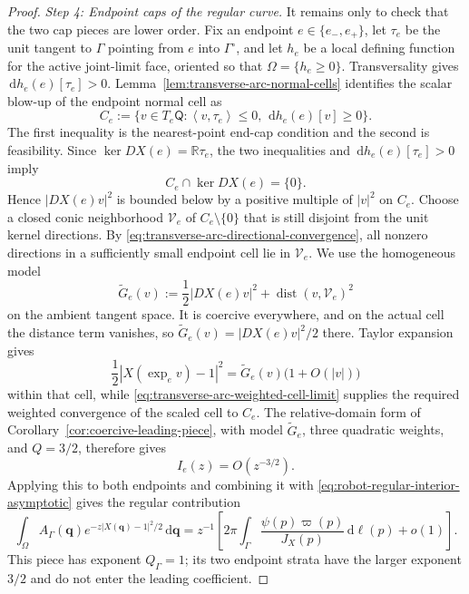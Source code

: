 \documentclass[11pt]{amsart}
\numberwithin{equation}{section}
\theoremstyle{definition}
\theoremstyle{remark}
\DeclareMathOperator{\dist}{dist}
\newcommand{\R}{\mathbb{R}}
\newcommand{\dd}{\,\mathrm{d}}
\newcommand{\inner}[2]{\left\langle #1,#2\right\rangle}
\begin{document}
\begin{proof}
\smallskip
\noindent\emph{Step 4: Endpoint caps of the regular curve.}
It remains only to check that the two cap pieces are lower order.  Fix an
endpoint $e\in\{e_-,e_+\}$, let $\tau_e$ be the unit tangent to $\Gamma$
pointing from $e$ into $\Gamma^\circ$, and let $h_e$ be a local defining
function for the active joint-limit face, oriented so that
$\Omega=\{h_e\ge0\}$.  Transversality gives
$\dd h_e(e)[\tau_e]>0$.  Lemma~\ref{lem:transverse-arc-normal-cells} identifies the scalar blow-up of
the endpoint normal cell as
\begin{equation}\label{eq:robot-endpoint-cone}
 C_e:=\{v\in T_e\mathsf Q:
       \inner{v}{\tau_e}\le0,\ \dd h_e(e)[v]\ge0\}.
\end{equation}
The first inequality is the nearest-point end-cap condition and the second is
feasibility.  Since $\ker DX(e)=\R\tau_e$, the two inequalities and
$\dd h_e(e)[\tau_e]>0$ imply
\[
 C_e\cap\ker DX(e)=\{0\}.
\]
Hence $|DX(e)v|^2$ is bounded below by a positive multiple of $|v|^2$ on
$C_e$.  Choose a closed conic neighborhood $\mathcal V_e$ of $C_e\setminus\{0\}$ that
is still disjoint from the unit kernel directions.  By
\eqref{eq:transverse-arc-directional-convergence}, all nonzero directions in a
sufficiently small endpoint cell lie in $\mathcal V_e$.  We use the homogeneous model
\[
 \widetilde G_e(v)
 :=\frac12|DX(e)v|^2+\dist(v,\mathcal V_e)^2
\]
on the ambient tangent space.  It is coercive everywhere, and on the actual
cell the distance term vanishes, so $\widetilde G_e(v)=|DX(e)v|^2/2$ there.
Taylor expansion gives
\[
 \frac12|X(\exp_e v)-1|^2
 =\widetilde G_e(v)\bigl(1+O(|v|)\bigr)
\]
within that cell, while
\eqref{eq:transverse-arc-weighted-cell-limit} supplies the required weighted
convergence of the scaled cell to $C_e$.  The relative-domain form of
Corollary~\ref{cor:coercive-leading-piece}, with model
$\widetilde G_e$, three quadratic weights, and $Q=3/2$, therefore gives
\[
 I_e(z)=O(z^{-3/2}).
\]
Applying this to both endpoints and combining it with
\eqref{eq:robot-regular-interior-asymptotic} gives the regular contribution
\begin{equation}\label{eq:robot-regular-asymptotic}
 \int_\Omega A_\Gamma(\bm q)e^{-z|X(\bm q)-1|^2/2}\dd \bm q
 =z^{-1}\left[
 2\pi\int_\Gamma\frac{\psi(p)\varpi(p)}{J_X(p)}\dd\ell(p)
 +o(1)\right].
\end{equation}
This piece has exponent $Q_\Gamma=1$; its two endpoint strata have the larger
exponent $3/2$ and do not enter the leading coefficient.


\end{proof}
\end{document}
